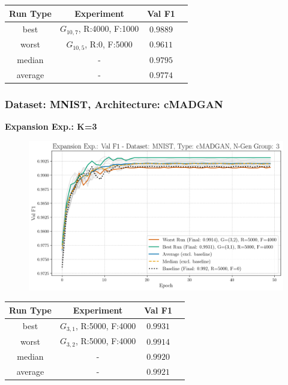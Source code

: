 \begin{table}[H]
	\vspace{-1em}
	\centering
	\begin{tabular}{|c|c|c|c|}
		\hline
		Run Type & Experiment & Val F1 \\ \hline
		best & \(G_{10, 7}\), R:4000, F:1000 & $0.9889$\\ \hline
		worst & \(G_{10, 5}\), R:0, F:5000 & $0.9611$\\ \hline
		median & - & $0.9795$\\ \hline
		average & - & $0.9774$
		\\ \hline
	\end{tabular}
\end{table}
\newpage
\subsubsection{Dataset: MNIST, Architecture: cMADGAN}
\noindent\textbf{Expansion Exp.: K=3}
\begin{figure}[htbp]
	\centering
	\includegraphics[width=.85\textwidth]{abb/strat_classifier_performance/MNIST_STRATIFIED_CLASSIFIERS_cMADGAN_NEW/expansion_experiments/val_f1_score_cMADGAN_MNIST_n_gen_3_all.png}
	\label{fig:app_strat_class_performance_expansion_exp._val_f1_score_3}
\end{figure}
\begin{table}[H]
	\vspace{-1em}
	\centering
	\begin{tabular}{|c|c|c|c|}
		\hline
		Run Type & Experiment & Val F1 \\ \hline
		best & \(G_{3, 1}\), R:5000, F:4000 & $0.9931$\\ \hline
		worst & \(G_{3, 2}\), R:5000, F:4000 & $0.9914$\\ \hline
		median & - & $0.9920$\\ \hline
		average & - & $0.9921$
		\\ \hline
	\end{tabular}
\end{table}
